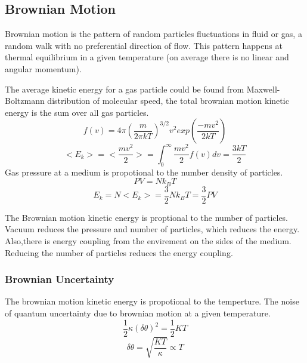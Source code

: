 \documentclass[\main/master.tex]{subfiles}
\begin{document}
\subsection{Brownian Motion}
Brownian motion is the pattern of random particles fluctuations in fluid or gas, a random walk with no preferential direction of flow. This pattern happens at thermal equilibrium in a given temperature (on average there is no linear and angular momentum). 
\par
The average kinetic energy for a gas particle could be found from Maxwell-Boltzmann distribution of molecular speed, the total brownian motion kinetic energy is the sum over all gas particles.
\begin{equation}
f(v) = 4\pi(\frac{m}{2\pi kT})^{3/2}v^2exp(\frac{-mv^2}{2kT})     \label{eqn:Maxwell_Boltzmann}
\end{equation}  
\begin{equation}
<E_k>=<\frac{mv^2}{2}> = \int_{0}^{\infty}\frac{mv^2}{2}f(v)dv =  \frac{3kT}{2}    \label{eqn:avrage_kinetic}
\end{equation}
Gas pressure at a medium is propotional to the number density of particles.    
\begin{equation}
PV = Nk_BT  \label{eqn:ideal-gasses}
\end{equation}
\begin{equation}
E_k=N<E_k> =\frac{3}{2}Nk_BT = \frac{3}{2}PV    \label{eqn:total_kinetic}
\end{equation}

The Brownian motion kinetic energy is proptional to the number of particles. Vacuum reduces the pressure and number of particles, which reduces the energy. Also,there is energy coupling from the envirement on the sides of the medium. Reducing the number of particles reduces the energy coupling.
\subsubsection{Brownian Uncertainty}
The brownian motion kinetic energy is propotional to the temperture. The noise of quantum uncertainty due to brownian motion at a given temperature. 
\begin{equation}
\frac{1}{2}\kappa (\delta\theta)^2= \frac{1}{2}KT  \label{eqn:radiation force}
\end{equation}
\begin{equation}
\delta\theta = \sqrt{\frac{KT}{\kappa}}\propto{T}  \label{eqn:radiation force}
\end{equation}
\end{document}
